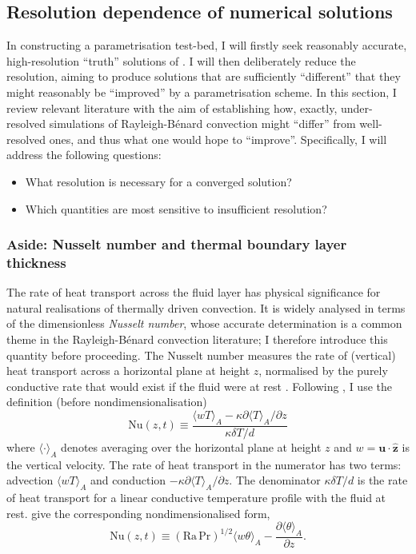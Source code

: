 \documentclass[titlepage]{article}
\numberwithin{equation}{section}
\newcommand{\pdiff}[2]{\frac{\partial #1}{\partial #2}}
\renewcommand\vec{\bm}
\newcommand{\uvec}[1]{\vec{\hat{#1}}}
\newcommand{\prandtl}{\ensuremath{\mathrm{Pr}}}
\newcommand{\rayleigh}{\ensuremath{\mathrm{Ra}}}
\newcommand{\nusselt}{\ensuremath{\mathrm{Nu}}}
\newcommand{\rb}{Rayleigh-B\'{e}nard}
\begin{document}
\subsection{Resolution dependence of numerical solutions}
In constructing a parametrisation test-bed, I will firstly seek
reasonably accurate, high-resolution ``truth'' solutions of
. I will then deliberately reduce
the resolution, aiming to produce solutions that are sufficiently
``different'' that they might reasonably be ``improved'' by a parametrisation
scheme. In this section, I review relevant literature with the aim of
establishing how, exactly, under-resolved simulations of \rb{} convection
might ``differ'' from well-resolved ones, and thus what one would hope to
``improve''. Specifically, I will address the following questions:
\begin{itemize}
    \item What resolution is necessary for a converged solution?
    \item Which quantities are most sensitive to insufficient resolution?
\end{itemize}

\subsubsection{Aside: Nusselt number and thermal boundary layer thickness}
The rate of heat transport across the fluid layer has physical significance for
natural realisations of thermally driven convection. It is widely analysed in
terms of the dimensionless \emph{Nusselt number}, whose accurate determination
is a common theme in the \rb{} convection literature; I therefore introduce
this quantity before proceeding. The Nusselt number measures the rate of
(vertical) heat transport across a horizontal plane at height $z$, normalised
by the purely conductive rate that would exist if the fluid were at rest
\parencite{verzicco1999}. Following \textcite{chilla2012}, I use the definition
(before nondimensionalisation)
\begin{equation}
    \label{eqn:dim_nusselt}
    \nusselt(z,t) \equiv \frac{
        \langle wT \rangle_A - \kappa \partial \langle T \rangle_A / \partial z
    }{
        \kappa \delta T / d
    }
\end{equation}
where $\langle \cdot \rangle_A$ denotes averaging over the horizontal
plane at height $z$ and $w = \vec{u} \cdot \uvec{z}$ is the vertical
velocity. The rate of heat transport in the numerator has two terms:
advection $\langle wT \rangle_A$ and conduction
$-\kappa \partial \langle T \rangle_A / \partial z$. The denominator
$\kappa \delta T / d$ is the rate of heat transport for a linear
conductive temperature profile with the fluid at rest.
\textcite{scheel2013} give the corresponding nondimensionalised form,
\begin{equation}
    \label{eqn:nusselt}
    \nusselt(z,t) \equiv (\rayleigh\,\prandtl)^{1/2} \langle w \theta \rangle_A
        - \pdiff{\langle \theta \rangle_A}{z}.
\end{equation}
\end{document}
